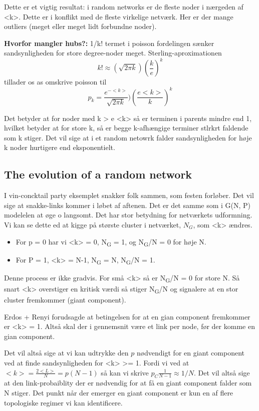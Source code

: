 \documentclass[11pt]{article}
\begin{document}
Dette er et vigtig resultat: i random networks er de fleste noder i nærgeden af <k>. Dette er i konflikt med de fleste virkelige netværk. Her er der mange outliers (meget eller meget lidt forbundne noder). 

\textbf{Hvorfor mangler hubs?:} 1/k! termet i poisson fordelingen sænker sandsynligheden for store degree-noder meget. Sterling-aproximationen $$ k! \approx (\sqrt{2 \pi k}) (\frac{k}{e})^{k} $$ tillader os as omskrive poisson til 
$$ p_{k} = \frac{e^{-<k>}}{\sqrt{2 \pi k}} ) (\frac{e <k>}{k})^{k} $$ 

Det betyder at for noder med k > e <k> så er terminen i parents mindre end 1, hvilket betyder at for store k, så er begge k-afhængige terminer stlrkrt faldende som k stiger. Det vil sige at i et random netowrk falder sandsynligheden for høje k noder hurtigere end eksponentielt.

\subsection{The evolution of a random network}
\label{sec:org2a04ca5}
I vin-concktail party eksemplet snakker folk sammen, som festen forløber. Det vil sige at snakke-links kommer i løbet af aftenen. Det er det samme som i G(N, P) modelelen at øge o langsomt. Det har stor betydning for netværkets udformning. Vi kan se dette ed at kigge på største cluster i netværket, \(N_G\), som <k> ændres.  

\begin{itemize}
\item For p = 0 har vi <k> = 0, N\textsubscript{G} = 1, og N\textsubscript{G}/N = 0 for høje N.
\item For P = 1, <k> = N-1, N\textsubscript{G} = N, N\textsubscript{G}/N = 1.
\end{itemize}

Denne process er ikke gradvis. For små <k> så er N\textsubscript{G}/N = 0 for store N. Så snart <k> overstiger en kritisk værdi så stiger N\textsubscript{G}/N og signalere at en stor cluster fremkommer (giant component).

Erdos + Renyi forudsagde at betingelsen for at en gian component fremkommer er <k> = 1. Altså skal der i gennemsnit være et link per node, før der komme en gian component. 

Det vil altså sige at vi kan udtrykke den \(p\) nødvendigt for en giant component ved at finde sandsynligheden for <k> >= 1. Fordi vi ved at \(<k> = \frac{2<L>}{N} = p(N-1)\) så kan vi skrive \(p_{C} \frac{1}{N-1} \approx 1/N\). Det vil altså sige at den link-probaiblity der er nødvendig for at få en giant component falder som N stiger. Det punkt når der emerger en giant component er kun en af flere topologiske regimer vi kan identificere. 
\end{document}
